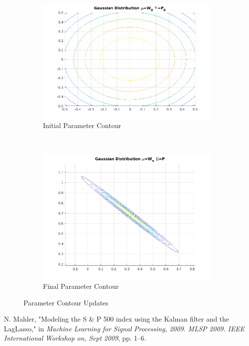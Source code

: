 \documentclass[11pt, fleqn]{article}
\begin{document}
\begin{figure}[!h]
    \centering
	\begin{subfigure}[b]{0.3\textwidth}
        \includegraphics[width=\textwidth]{kalman-parameter-contour-initial.png}
	\caption{Initial Parameter Contour}
	\label{fig:kalman-parameter-contour-initial}
    \end{subfigure}
    ~ 
	\begin{subfigure}[b]{0.3\textwidth}
        \includegraphics[width=\textwidth]{kalman-parameter-contour.png}
	\caption{Final Parameter Contour}
	\label{fig:kalman-parameter-contour}
    \end{subfigure}
	\caption{Parameter Contour Updates}
	\label{fig:kalman-parameter}
\end{figure}

\begin{thebibliography}{9}
N. Mahler, "Modeling the S \& P 500 index using the Kalman filter and the LagLasso," in \textit{Machine Learning for Signal Processing, 2009. MLSP 2009. IEEE International Workshop on, Sept 2009}, pp. 1–6.

\end{thebibliography}
\end{document}
